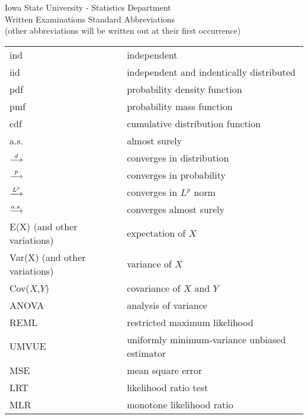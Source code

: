 \documentclass{article}
\begin{document}
\noindent
Iowa State University - Statistics Department \\
Written Examinations Standard Abbreviations \\
(other abbreviations will be written out at their first occurrence)

\vspace{0.1in}

\begin{tabular}{ll}
\hline
ind & independent \\
iid & independent and indentically distributed \\
pdf & probability density function \\
pmf & probability mass function \\
cdf & cumulative distribution function \\
a.s. & almost surely \\
\hline
$\stackrel{d}{\longrightarrow}$ & converges in distribution \\
$\stackrel{p}{\longrightarrow}$ & converges in probability \\
$\stackrel{L^p}{\longrightarrow}$ & converges in $L^p$ norm \\
$\stackrel{a.s.}{\longrightarrow}$ & converges almost surely \\
\hline
E(X) (and other variations) & expectation of $X$ \\
Var(X) (and other variations) & variance of $X$ \\
Cov($X$,$Y$) & covariance of $X$ and $Y$ \\
\hline
ANOVA & analysis of variance \\
REML & restricted maximum likelihood \\
UMVUE & uniformly minimum-variance unbiased estimator \\
MSE & mean square error \\
LRT & likelihood ratio test \\
MLR & monotone likelihood ratio \\
\hline
\end{tabular}
\end{document}
